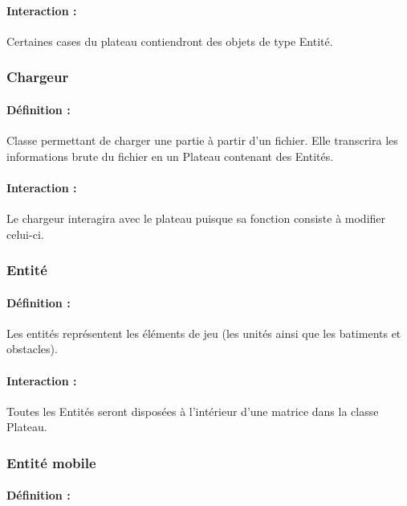 \documentclass[12pt]{article}
\begin{document}
				\paragraph{Interaction :}

				Certaines cases du plateau contiendront des objets de type Entité.
				

			\subsubsection{Chargeur}

				\paragraph{Définition :}

				Classe permettant de charger une partie à partir d'un fichier. Elle transcrira les informations brute du fichier en un Plateau contenant des Entités.

				\paragraph{Interaction :}

				Le chargeur interagira avec le plateau puisque sa fonction consiste à modifier celui-ci.

			\subsubsection{Entité}

				\paragraph{Définition :}

				Les entités représentent les éléments de jeu (les unités ainsi que les batiments et obstacles).

				\paragraph{Interaction :}

				Toutes les Entités seront disposées à l'intérieur d'une matrice dans la classe Plateau.

			\subsubsection{Entité mobile}

				\paragraph{Définition :}
\end{document}
